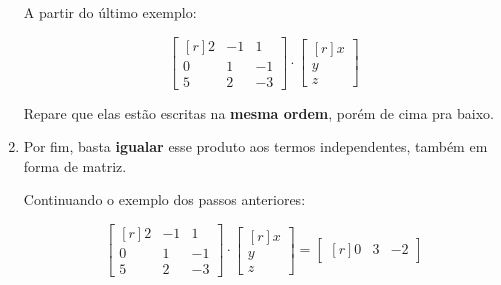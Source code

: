 \begin{enumerate}
    A partir do último exemplo:
    
    $$
    \begin{bmatrix*}[r]
        2 & -1 & 1\\
        0 & 1 & -1\\
        5 & 2 & -3
    \end{bmatrix*} \cdot \begin{bmatrix*}[r] x\\y\\z \end{bmatrix*}
    $$
    
    Repare que elas estão escritas na \textbf{mesma ordem}, porém de cima pra baixo.
    
    \item Por fim, basta \textbf{igualar} esse produto aos termos independentes, também em forma de matriz.
    
    Continuando o exemplo dos passos anteriores:
    
    $$
    \begin{bmatrix*}[r]
        2 & -1 & 1\\
        0 & 1 & -1\\
        5 & 2 & -3
    \end{bmatrix*} \cdot \begin{bmatrix*}[r] 
    x\\y\\z 
    \end{bmatrix*}=\begin{bmatrix*}[r]
    0 & 3 & -2
    \end{bmatrix*}
    $$
    
\end{enumerate}